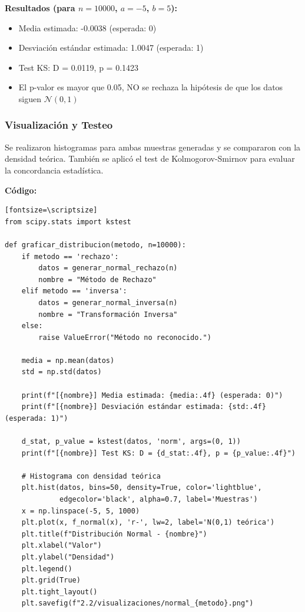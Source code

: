 \documentclass{article}
\begin{document}
\textbf{Resultados (para $n=10000$, $a=-5$, $b=5$):}
\begin{itemize}
    \item Media estimada: -0.0038 (esperada: 0)
    \item Desviación estándar estimada: 1.0047 (esperada: 1)
    \item Test KS: D = 0.0119, p = 0.1423
    \item El p-valor es mayor que 0.05, NO se rechaza la hipótesis de que los datos siguen $\mathcal{N}(0,1)$
\end{itemize}

\vspace{0.5em}
\subsubsection{Visualización y Testeo}

Se realizaron histogramas para ambas muestras generadas y se compararon con la densidad teórica. También se aplicó el test de Kolmogorov-Smirnov para evaluar la concordancia estadística.

\textbf{Código:}
\begin{verbatim}[fontsize=\scriptsize]
from scipy.stats import kstest

def graficar_distribucion(metodo, n=10000):
    if metodo == 'rechazo':
        datos = generar_normal_rechazo(n)
        nombre = "Método de Rechazo"
    elif metodo == 'inversa':
        datos = generar_normal_inversa(n)
        nombre = "Transformación Inversa"
    else:
        raise ValueError("Método no reconocido.")

    media = np.mean(datos)
    std = np.std(datos)

    print(f"[{nombre}] Media estimada: {media:.4f} (esperada: 0)")
    print(f"[{nombre}] Desviación estándar estimada: {std:.4f} (esperada: 1)")

    d_stat, p_value = kstest(datos, 'norm', args=(0, 1))
    print(f"[{nombre}] Test KS: D = {d_stat:.4f}, p = {p_value:.4f}")

    # Histograma con densidad teórica
    plt.hist(datos, bins=50, density=True, color='lightblue',
             edgecolor='black', alpha=0.7, label='Muestras')
    x = np.linspace(-5, 5, 1000)
    plt.plot(x, f_normal(x), 'r-', lw=2, label='N(0,1) teórica')
    plt.title(f"Distribución Normal - {nombre}")
    plt.xlabel("Valor")
    plt.ylabel("Densidad")
    plt.legend()
    plt.grid(True)
    plt.tight_layout()
    plt.savefig(f"2.2/visualizaciones/normal_{metodo}.png")
\end{verbatim}
\end{document}
